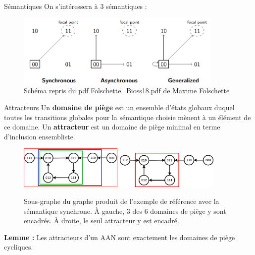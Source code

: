 \documentclass{beamer}
\begin{document}
\begin{frame}{Sémantiques}
	\pause
	On s'intéressera à 3 sémantiques : 
	\begin{figure}[!h]
		\pause
		\includegraphics[width=10cm]{Screenshot.png}
		\caption{Schéma repris du pdf Folschette\_Bioss18.pdf de Maxime Folschette}
	\end{figure}
\end{frame}

\begin{frame}{Attracteurs}
	\pause
	Un \textbf{domaine de piège} est un ensemble d'états globaux duquel toutes les transitions globales pour la sémantique choisie mènent à un élément de ce domaine.
	\pause
	Un \textbf{attracteur} est un domaine de piège minimal en terme d'inclusion ensembliste.\\
	\begin{figure}[!h]
		\pause
		\includegraphics[width=5cm]{presonal_example_synch.eps}
		\includegraphics[width=5cm]{presonal_example_synch2.eps}
		\caption{Sous-graphe du graphe produit de l'exemple de référence avec la sémantique synchrone. \`A gauche, 3 des 6 domaines de piège y sont encadrés. \`A droite, le seul attracteur y est encadré.}
	\end{figure}
	\pause
	\textbf{Lemme :} Les attracteurs d'un AAN sont exactement les domaines de piège cycliques.
\end{frame}
\end{document}
